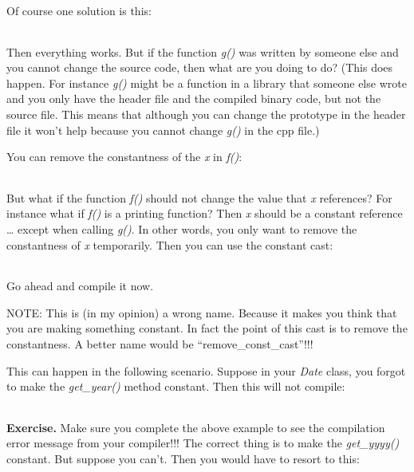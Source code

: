 \documentclass[
]{article}
\begin{document}
Of course one solution is this:

\begin{longtable}[]{@{}@{}}
\toprule
\endhead
\bottomrule
\end{longtable}

Then everything works. But if the function \emph{g()} was written by
someone else and you cannot change the source code, then what are you
doing to do? (This does happen. For instance \emph{g()} might be a
function in a library that someone else wrote and you only have the
header file and the compiled binary code, but not the source file. This
means that although you can change the prototype in the header file it
won't help because you cannot change \emph{g()} in the cpp file.)

You can remove the constantness of the \emph{x} in \emph{f()}:

\begin{longtable}[]{@{}@{}}
\toprule
\endhead
\bottomrule
\end{longtable}

But what if the function \emph{f()} should not change the value that
\emph{x} references? For instance what if \emph{f()} is a printing
function? Then \emph{x} should be a constant reference \ldots{} except
when calling \emph{g()}. In other words, you only want to remove the
constantness of \emph{x} temporarily. Then you can use the constant
cast:

\begin{longtable}[]{@{}@{}}
\toprule
\endhead
\bottomrule
\end{longtable}

Go ahead and compile it now.

NOTE: This is (in my opinion) a wrong name. Because it makes you think
that you are making something constant. In fact the point of this cast
is to remove the constantness. A better name would be
``remove\_const\_cast''!!!

This can happen in the following scenario. Suppose in your \emph{Date}
class, you forgot to make the \emph{get\_year()} method constant. Then
this will not compile:

\begin{longtable}[]{@{}@{}}
\toprule
\endhead
\bottomrule
\end{longtable}

\textbf{Exercise.} Make sure you complete the above example to see the
compilation error message from your compiler!!! The correct thing is to
make the \emph{get\_yyyy()} constant. But suppose you can't. Then you
would have to resort to this:
\end{document}

